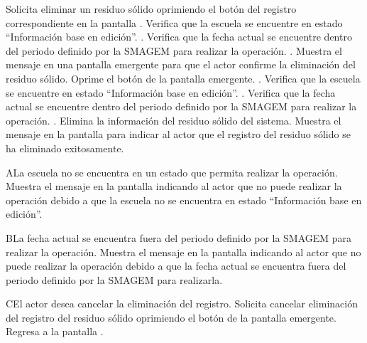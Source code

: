  \begin{UCtrayectoria}
    \UCpaso[\UCactor] Solicita eliminar un residuo sólido oprimiendo el botón \botKo del registro correspondiente en la pantalla .
    \UCpaso[\UCsist] Verifica que la escuela se encuentre en estado ``Información base en edición''. .
    \UCpaso[\UCsist] Verifica que la fecha actual se encuentre dentro del periodo definido por la SMAGEM para realizar la operación. .
    \UCpaso[\UCsist] Muestra el mensaje  en una pantalla emergente para que el actor confirme la eliminación del residuo sólido.
    \UCpaso[\UCactor] Oprime el botón  de la pantalla emergente. .
    \UCpaso[\UCsist] Verifica que la escuela se encuentre en estado ``Información base en edición''. .
    \UCpaso[\UCsist] Verifica que la fecha actual se encuentre dentro del periodo definido por la SMAGEM para realizar la operación. .
    \UCpaso[\UCsist] Elimina la información del residuo sólido del sistema.
    \UCpaso[\UCsist] Muestra el mensaje  en la pantalla  para indicar al actor que el registro del residuo sólido se ha eliminado exitosamente. 
    
 \end{UCtrayectoria}
 
    \begin{UCtrayectoriaA}{A}{La escuela no se encuentra en un estado que permita realizar la operación.}
    \UCpaso[\UCsist] Muestra el mensaje  en la pantalla  indicando al actor que no puede realizar la operación debido a que la escuela no se encuentra en estado ``Información base en edición''. 
 \end{UCtrayectoriaA}

   \begin{UCtrayectoriaA}{B}{La fecha actual se encuentra fuera del periodo definido por la SMAGEM para realizar la operación.}
    \UCpaso[\UCsist] Muestra el mensaje  en la pantalla  indicando al actor que no puede realizar la operación debido a que la fecha actual se encuentra fuera del periodo definido por la SMAGEM para realizarla. 
 \end{UCtrayectoriaA}
 
    \begin{UCtrayectoriaA}{C}{El actor desea cancelar la eliminación del registro.}
    \UCpaso[\UCactor] Solicita cancelar eliminación del registro del residuo sólido oprimiendo el botón  de la pantalla emergente.
    \UCpaso[] Regresa a la pantalla .    
 \end{UCtrayectoriaA}
